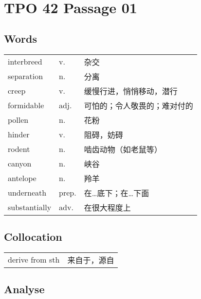 \section{TPO 42 Passage 01}

\subsection{Words}

\begin{tabular}{lll}
    interbreed    & v.    & 杂交             \\
    separation    & n.    & 分离             \\
    creep         & v.    & 缓慢行进，悄悄移动，潜行   \\
    formidable    & adj.  & 可怕的；令人敬畏的；难对付的 \\
    pollen        & n.    & 花粉             \\
    hinder        & v.    & 阻碍，妨碍          \\
    rodent        & n.    & 啮齿动物（如老鼠等）     \\
    canyon        & n.    & 峡谷             \\
    antelope      & n.    & 羚羊             \\
    underneath    & prep. & 在…底下；在…下面      \\
    substantially & adv.  & 在很大程度上         \\
\end{tabular}

\subsection{Collocation}

\begin{tabular}{ll}
    derive from sth & 来自于，源自 \\
\end{tabular}

\newpage

\subsection{Analyse}

